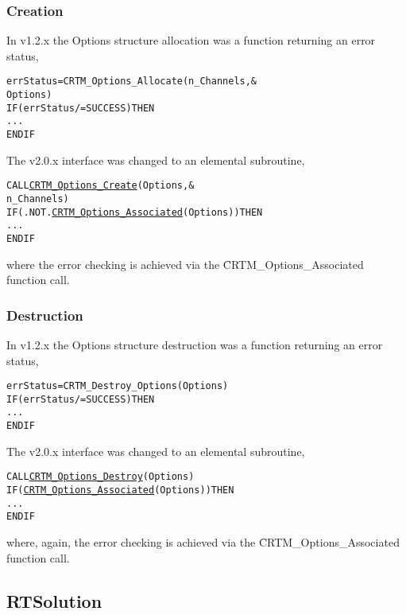 \subsubsection{Creation}
In v1.2.x the Options structure allocation was a function returning an error status,
\begin{alltt}
  errStatus = CRTM_Options_Allocate( n_Channels, &
                                     Options     )
  IF ( errStatus /= SUCCESS ) THEN
    ...
  END IF\end{alltt}
The v2.0.x interface was changed to an elemental subroutine,
\begin{alltt}
  CALL \hyperref[sec:CRTM_Options_Create_interface]{CRTM_Options_Create}( Options   , &
                            n_Channels  )
  IF ( .NOT. \hyperref[sec:CRTM_Options_Associated_interface]{CRTM_Options_Associated}( Options ) ) THEN
    ...
  END IF\end{alltt}
where the error checking is achieved via the \f{CRTM\_Options\_Associated} function call.

\subsubsection{Destruction}
In v1.2.x the Options structure destruction was a function returning an error status,
\begin{alltt}
  errStatus = CRTM_Destroy_Options( Options )
  IF ( errStatus /= SUCCESS ) THEN
    ...
  END IF\end{alltt}
The v2.0.x interface was changed to an elemental subroutine,
\begin{alltt}
  CALL \hyperref[sec:CRTM_Options_Destroy_interface]{CRTM_Options_Destroy}( Options )
  IF ( \hyperref[sec:CRTM_Options_Associated_interface]{CRTM_Options_Associated}( Options ) ) THEN
    ...
  END IF\end{alltt}
where, again, the error checking is achieved via the \f{CRTM\_Options\_Associated} function call.


\subsection{RTSolution}
